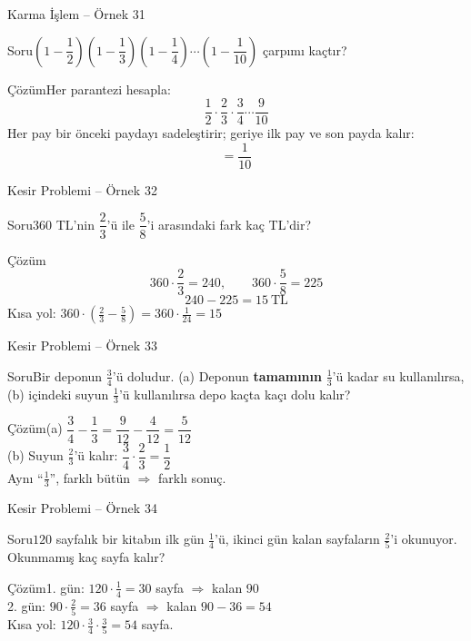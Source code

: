 \documentclass[aspectratio=169,11pt]{beamer}
\newcommand{\soru}[3]{%
\begin{frame}{#1}
  \begin{block}{Soru}\large #2\end{block}
  \pause
  \begin{exampleblock}{Çözüm}\large #3\end{exampleblock}
\end{frame}}
\begin{document}
\soru{Karma İşlem -- Örnek 31}
{\(\left(1-\dfrac{1}{2}\right)\left(1-\dfrac{1}{3}\right)\left(1-\dfrac{1}{4}\right)\cdots\left(1-\dfrac{1}{10}\right)\) çarpımı kaçtır?}
{Her parantezi hesapla:
\[\frac{1}{2}\cdot\frac{2}{3}\cdot\frac{3}{4}\cdots\frac{9}{10}\]
Her pay bir önceki paydayı sadeleştirir; geriye ilk pay ve son payda kalır:
\[=\frac{1}{10}\]}

\soru{Kesir Problemi -- Örnek 32}
{\(360\) TL'nin \(\dfrac{2}{3}\)'ü ile \(\dfrac{5}{8}\)'i arasındaki fark kaç TL'dir?}
{\[360\cdot\frac{2}{3}=240,\qquad 360\cdot\frac{5}{8}=225\]
\[240-225=15\ \text{TL}\]
Kısa yol: \(360\cdot\left(\frac{2}{3}-\frac{5}{8}\right)=360\cdot\frac{1}{24}=15\)}

\soru{Kesir Problemi -- Örnek 33}
{Bir deponun \(\frac{3}{4}\)'ü doludur. (a) Deponun \textbf{tamamının} \(\frac{1}{3}\)'ü kadar su kullanılırsa, (b) içindeki suyun \(\frac{1}{3}\)'ü kullanılırsa depo kaçta kaçı dolu kalır?}
{(a) \(\dfrac{3}{4}-\dfrac{1}{3}=\dfrac{9}{12}-\dfrac{4}{12}=\dfrac{5}{12}\)\\[4pt]
(b) Suyun \(\frac{2}{3}\)'ü kalır: \quad \(\dfrac{3}{4}\cdot\dfrac{2}{3}=\dfrac{1}{2}\)\\[4pt]
Aynı ``\(\frac{1}{3}\)'', farklı bütün \(\Rightarrow\) farklı sonuç.}

\soru{Kesir Problemi -- Örnek 34}
{\(120\) sayfalık bir kitabın ilk gün \(\frac{1}{4}\)'ü, ikinci gün kalan sayfaların \(\frac{2}{5}\)'i okunuyor. Okunmamış kaç sayfa kalır?}
{1. gün: \(120\cdot\frac{1}{4}=30\) sayfa \(\Rightarrow\) kalan \(90\)\\[3pt]
2. gün: \(90\cdot\frac{2}{5}=36\) sayfa \(\Rightarrow\) kalan \(90-36=54\)\\[3pt]
Kısa yol: \(120\cdot\frac{3}{4}\cdot\frac{3}{5}=54\) sayfa.}
\end{document}
